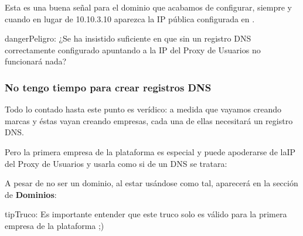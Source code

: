 \documentclass[letterpaper,10pt,spanish]{sphinxmanual}
\begin{document}
Esta es una buena señal para el dominio que acabamos de configurar, siempre y cuando en lugar de 10.10.3.10 aparezca la IP pública configurada en {\hyperref[internal_calls/god_portal:proxyusers]{}}.

\noindent{}

\begin{notice}{danger}{Peligro:}
¿Se ha insistido suficiente en que sin un registro DNS correctamente configurado apuntando a la IP del Proxy de Usuarios no funcionará nada?
\end{notice}


\subsubsection{No tengo tiempo para crear registros DNS}
\label{internal_calls/brand_portal:dnshack}\label{internal_calls/brand_portal:i-have-no-time-for-a-dns-registry}
Todo lo contado hasta este punto es verídico: a medida que vayamos creando marcas y éstas vayan creando empresas, cada una de ellas necesitará un registro DNS.

Pero la primera empresa de la plataforma es especial y puede apoderarse de laIP del Proxy de Usuarios y usarla como si de un DNS se tratara:

\noindent{}

A pesar de no ser un dominio, al estar usándose como tal, aparecerá en la sección de \textbf{Dominios}:

\noindent{}

\begin{notice}{tip}{Truco:}
Es importante entender que este truco solo es válido para la primera   empresa de la plataforma ;)
\end{notice}
\end{document}
